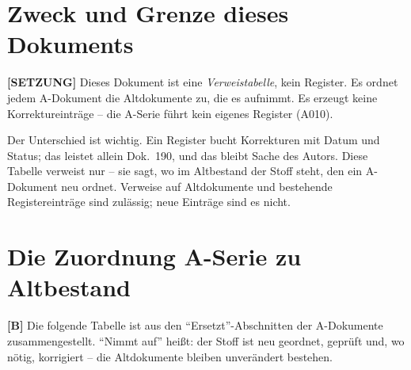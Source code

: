 \section{Zweck und Grenze dieses Dokuments}

\textbf{[SETZUNG]} Dieses Dokument ist eine \emph{Verweistabelle}, kein Register.
Es ordnet jedem A-Dokument die Altdokumente zu, die es aufnimmt. Es erzeugt
keine Korrektureinträge -- die A-Serie führt kein eigenes Register (A010).

Der Unterschied ist wichtig. Ein Register bucht Korrekturen mit Datum und Status;
das leistet allein Dok.~190, und das bleibt Sache des Autors. Diese Tabelle
verweist nur -- sie sagt, wo im Altbestand der Stoff steht, den ein A-Dokument
neu ordnet. Verweise auf Altdokumente und bestehende Registereinträge sind
zulässig; neue Einträge sind es nicht.

\section{Die Zuordnung A-Serie zu Altbestand}

\textbf{[B]} Die folgende Tabelle ist aus den \enquote{Ersetzt}-Abschnitten der
A-Dokumente zusammengestellt. \enquote{Nimmt auf} heißt: der Stoff ist neu
geordnet, geprüft und, wo nötig, korrigiert -- die Altdokumente bleiben
unverändert bestehen.

